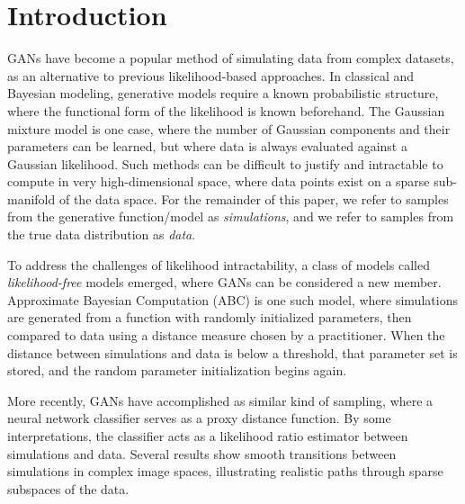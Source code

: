 \section{Introduction}

GANs have become a popular method of simulating data from complex datasets, as an alternative to previous likelihood-based approaches. In classical and Bayesian modeling, generative models require a known probabilistic structure, where the functional form of the likelihood is known beforehand. The Gaussian mixture model is one case, where the number of Gaussian components and their parameters can be learned, but where data is always evaluated against a Gaussian likelihood. Such methods can be difficult to justify and intractable to compute in very high-dimensional space, where data points exist on a sparse sub-manifold of the data space. For the remainder of this paper, we refer to samples from the generative function/model as \textit{simulations}, and we refer to samples from the true data distribution as \textit{data}.

To address the challenges of likelihood intractability, a class of models called \textit{likelihood-free} models emerged, where GANs can be considered a new member. Approximate Bayesian Computation (ABC) is one such model, where simulations are generated from a function with randomly initialized parameters, then compared to data using a distance measure chosen by a practitioner. When the distance between simulations and data is below a threshold, that parameter set is stored, and the random parameter initialization begins again.

More recently, GANs have accomplished as similar kind of sampling, where a neural network classifier serves as a proxy distance function. By some interpretations, the classifier acts as a likelihood ratio estimator between simulations and data. Several results show smooth transitions between simulations in complex image spaces, illustrating realistic paths through sparse subspaces of the data.

